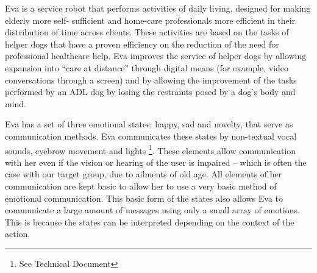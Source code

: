 \documentclass[project_eva.tex]{subfiles}
\begin{document}
Eva is a service robot that performs activities of daily living, designed for making elderly more self-
sufficient\cite{Forlizzi} and home-care professionals more efficient in their distribution of time across clients. These 
activities are based on the tasks of helper dogs that have a proven efficiency on the reduction of the need for professional 
healthcare help\cite{Diepenhorst}. Eva improves the service of helper dogs by allowing expansion into ``care at distance'' 
\cite{Evers} through digital means (for example, video conversations through a screen) and by allowing the improvement of the 
tasks performed by an ADL dog by losing the restraints posed by a dog’s body and mind. 

Eva has a set of three emotional states: happy, sad and novelty, that serve as communication methods. Eva communicates these 
states by non-textual vocal sounds, eyebrow movement and lights \footnote{See Technical Document}. These elements allow 
communication with her even if the vision or hearing of the user is impaired – which is often the case with our target group, 
due to ailments of old age.  All elements of her communication are kept basic to allow her to use a very basic method of 
emotional communication. This basic form of the states  also allows Eva to communicate a large amount of messages using only 
a small array of emotions. This is because the states can be interpreted depending on the context of the action. 
\end{document}
